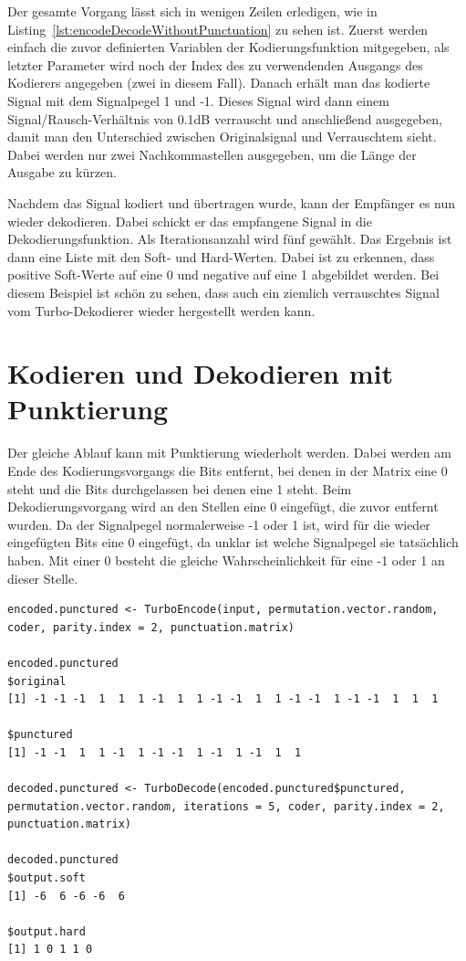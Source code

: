Der gesamte Vorgang lässt sich in wenigen Zeilen erledigen, wie in Listing~\ref{lst:encodeDecodeWithoutPunctuation} zu sehen ist. Zuerst werden einfach die zuvor definierten Variablen der Kodierungsfunktion mitgegeben, als letzter Parameter wird noch der Index des zu verwendenden Ausgangs des Kodierers angegeben (zwei in diesem Fall). Danach erhält man das kodierte Signal mit dem Signalpegel 1 und -1. Dieses Signal wird dann einem Signal/Rausch-Verhältnis von 0.1dB  verrauscht und anschließend ausgegeben, damit man den Unterschied zwischen Originalsignal und Verrauschtem sieht. Dabei werden nur zwei Nachkommastellen ausgegeben, um die Länge der Ausgabe zu kürzen. 

Nachdem das Signal kodiert und übertragen wurde, kann der Empfänger es nun wieder dekodieren. Dabei schickt er das empfangene Signal in die Dekodierungsfunktion. Als Iterationsanzahl wird fünf gewählt. Das Ergebnis ist dann eine Liste mit den Soft- und Hard-Werten. Dabei ist zu erkennen, dass positive Soft-Werte auf eine 0 und negative auf eine 1 abgebildet werden. Bei diesem Beispiel ist schön zu sehen, dass auch ein ziemlich verrauschtes Signal vom Turbo-Dekodierer wieder hergestellt werden kann.

\FloatBarrier
\section{Kodieren und Dekodieren mit Punktierung}
\label{sec:example_withPunctuation}

Der gleiche Ablauf kann mit Punktierung wiederholt werden. Dabei werden am Ende des Kodierungsvorgangs die Bits entfernt, bei denen in der Matrix eine 0 steht und die Bits durchgelassen bei denen eine 1 steht. Beim Dekodierungsvorgang wird an den Stellen eine 0 eingefügt, die zuvor entfernt wurden. Da der Signalpegel normalerweise -1 oder 1 ist, wird für die wieder eingefügten Bits eine 0 eingefügt, da unklar ist welche Signalpegel sie tatsächlich haben. Mit einer 0 besteht die gleiche Wahrscheinlichkeit für eine -1 oder 1 an dieser Stelle.

\begin{lstlisting}[caption=Kodierung und Dekodierung mit Punktierung, label={lst:encodeDecodeWithPunctuation}, float=!th]
encoded.punctured <- TurboEncode(input, permutation.vector.random, coder, parity.index = 2, punctuation.matrix)

encoded.punctured
$original
[1] -1 -1 -1  1  1  1 -1  1  1 -1 -1  1  1 -1 -1  1 -1 -1  1  1  1

$punctured
[1] -1 -1  1  1 -1  1 -1 -1  1 -1  1 -1  1  1

decoded.punctured <- TurboDecode(encoded.punctured$punctured, permutation.vector.random, iterations = 5, coder, parity.index = 2, punctuation.matrix)

decoded.punctured
$output.soft
[1] -6  6 -6 -6  6

$output.hard
[1] 1 0 1 1 0
\end{lstlisting}

